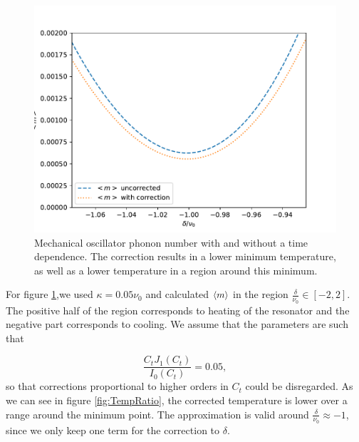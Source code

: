 \documentclass[reprint, amsmath,amssymb, aps,pra]{revtex4-1}
\begin{document}
\begin{figure}[h!]
\includegraphics[scale=.5]{TempGorden1.pdf}   
\caption{ Mechanical oscillator phonon number with and without a time dependence. The correction results in a lower minimum temperature, as well as a lower temperature in a region around this minimum.}\label{fig:TempComparisson}
\end{figure}

For figure \ref{fig:TempComparisson},we used $\kappa = 0.05\nu_0$ and calculated $\expval{m}$ in the region $\frac{\delta}{\nu_0}\in [-2,2]$. The positive half of the region corresponds to heating of the resonator and the negative part corresponds to cooling. We assume that the parameters are such that

\begin{equation}
\frac{C_tJ_1(C_t)}{I_0(C_t)} = 0.05,
\end{equation}
so that corrections proportional to higher orders in $C_t$ could be
disregarded. As we can see in figure \ref{fig:TempRatio}, the
corrected temperature is lower over a range around the minimum point.
 The approximation is valid around
$\frac{\delta}{\nu_0}\approx -1$, since we only keep one term for the
correction to $\delta$. 
\end{document}
